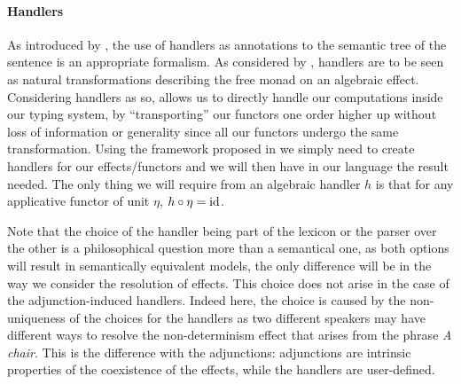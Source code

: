 \paragraph{Handlers}
\label{par:handlers}
As introduced by \cite{marsikAlgebraicEffectsHandlers}, the use of handlers
as annotations to the semantic tree of the sentence is an appropriate
formalism.
As considered by \cite{wuEffectHandlersScope2014}, handlers are to be seen
as natural transformations describing the free monad on an algebraic effect.
Considering handlers as so, allows us to directly handle our computations
inside our typing system, by ``transporting'' our functors one order higher up
without loss of information or generality since all our functors undergo the
same transformation.
Using the framework proposed in \cite{vandenbergFrameworkHigherorderEffects2024}
we simply need to create handlers for our effects/functors and we will then
have in our language the result needed.
The only thing we will require from an algebraic handler $h$ is that for any
applicative functor of unit $\eta$, $h\circ \eta = \mathrm{id}$.

\smallskip

Note that the choice of the handler being part of the lexicon or the parser
over the other is a philosophical question more than a semantical one, as both
options will result in semantically equivalent models, the only difference will
be in the way we consider the resolution of effects.
This choice does not arise in the case of the adjunction-induced
handlers.
Indeed here, the choice is caused by the non-uniqueness of the choices for
the handlers as two different speakers may have different ways to resolve the
non-determinism effect that arises from the phrase \textsl{A chair}.
This is the difference with the adjunctions: adjunctions are intrinsic
properties of the coexistence of the effects, while the handlers
are user-defined.

